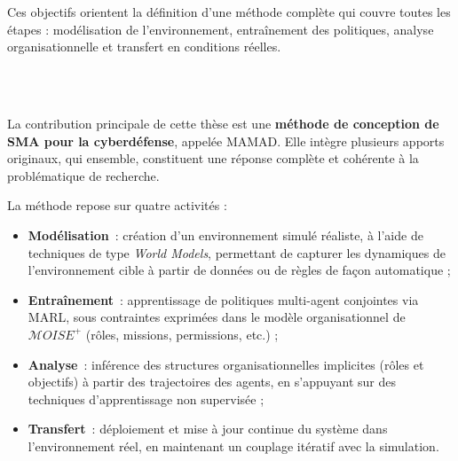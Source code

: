 \documentclass[ twoside,openright,titlepage,numbers=noenddot,headinclude,%
                footinclude=true,cleardoublepage=empty,abstractoff, %
                BCOR=5mm,paper=a4,fontsize=11pt,%
                french,american,%
                ]{scrreprt}
\begin{document}
Ces objectifs orientent la définition d'une méthode complète qui couvre toutes les étapes : modélisation de l'environnement, entraînement des politiques, analyse organisationnelle et transfert en conditions réelles.

\

\bigskip

\\

La contribution principale de cette thèse est une \textbf{méthode de conception de SMA pour la cyberdéfense}, appelée \ac{MAMAD}. Elle intègre plusieurs apports originaux, qui ensemble, constituent une réponse complète et cohérente à la problématique de recherche.

La méthode repose sur quatre activités :
\begin{itemize}
    \item \textbf{Modélisation}~: création d'un environnement simulé réaliste, à l'aide de techniques de type \textit{World Models}, permettant de capturer les dynamiques de l'environnement cible à partir de données ou de règles de façon automatique ;
    \item \textbf{Entraînement}~: apprentissage de politiques multi-agent conjointes via MARL, sous contraintes exprimées dans le modèle organisationnel de $\mathcal{M}OISE^+$ (rôles, missions, permissions, etc.) ;
    \item \textbf{Analyse}~: inférence des structures organisationnelles implicites (rôles et objectifs) à partir des trajectoires des agents, en s'appuyant sur des techniques d'apprentissage non supervisée ;
    \item \textbf{Transfert}~: déploiement et mise à jour continue du système dans l'environnement réel, en maintenant un couplage itératif avec la simulation.
\end{itemize}
\end{document}
